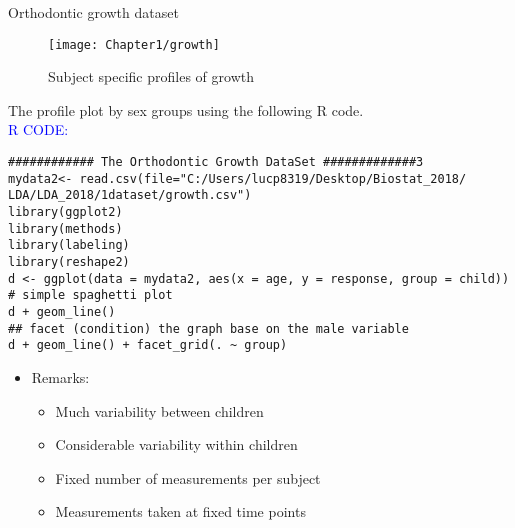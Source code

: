\documentclass{beamer}
\begin{document}
\begin{frame}{Orthodontic growth dataset}
\begin{figure}[h!]
	\centering
	\texttt{[image: Chapter1/growth]}
	\caption{Subject specific profiles of growth}
\end{figure}
\end{frame}

\begin{frame}[fragile]
The profile plot by sex groups using the following R code. \\
\vspace{1cm}
\textcolor{blue}{R CODE:} \scriptsize\begin{verbatim}
############ The Orthodontic Growth DataSet #############3
mydata2<- read.csv(file="C:/Users/lucp8319/Desktop/Biostat_2018/
LDA/LDA_2018/1dataset/growth.csv")
library(ggplot2)
library(methods)
library(labeling)
library(reshape2)
d <- ggplot(data = mydata2, aes(x = age, y = response, group = child))
# simple spaghetti plot
d + geom_line()
## facet (condition) the graph base on the male variable
d + geom_line() + facet_grid(. ~ group)
\end{verbatim}
\begin{itemize}
	\item Remarks:
	\begin{itemize}
	\item Much variability between children
	\item Considerable variability within children
	\item Fixed number of measurements per subject
	\item Measurements taken at fixed time points
\end{itemize}
\end{itemize}
\end{frame}
\end{document}
